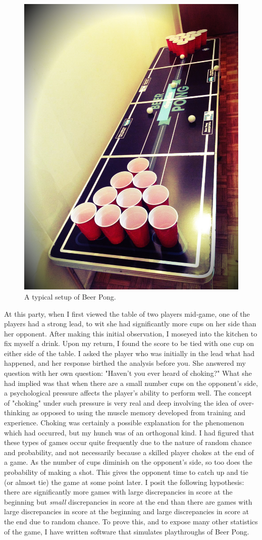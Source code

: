 \documentclass{article}
\begin{document}
\begin{figure}
	\centering
	\includegraphics[width=0.7\linewidth]{beerpong}
	\caption{A typical setup of Beer Pong.}
	\label{beerpongsetup}
\end{figure}

At this party, when I first viewed the table of two players mid-game, one of the players had a strong lead, to wit she had significantly more cups on her side than her opponent. After making this initial observation, I moseyed into the kitchen to fix myself a drink. Upon my return, I found the score to be tied with one cup on either side of the table. I asked the player who was initially in the lead what had happened, and her response birthed the analysis before you. She answered my question with her own question: "Haven't you ever heard of choking?" What she had implied was that when there are a small number cups on the opponent's side, a psychological pressure affects the player's ability to perform well. The concept of "choking" under such pressure is very real and deep involving the idea of over-thinking as opposed to using the muscle memory developed from training and experience. Choking was certainly a possible explanation for the phenomenon which had occurred, but my hunch was of an orthogonal kind. I had figured that these types of games occur quite frequently due to the nature of random chance and probability, and not necessarily because a skilled player chokes at the end of a game. As the number of cups diminish on the opponent's side, so too does the probability of making a shot. This gives the opponent time to catch up and tie (or almost tie) the game at some point later. I posit the following hypothesis: there are significantly more games with large discrepancies in score at the beginning but \textit{small} discrepancies in score at the end than there are games with large discrepancies in score at the beginning and large discrepancies in score at the end due to random chance. To prove this, and to expose many other statistics of the game, I have written software that simulates playthroughs of Beer Pong. 
\end{document}
